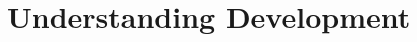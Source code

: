 \documentclass[../main]{subfiles}
\begin{document}
\section{Understanding Development}
\end{document}
